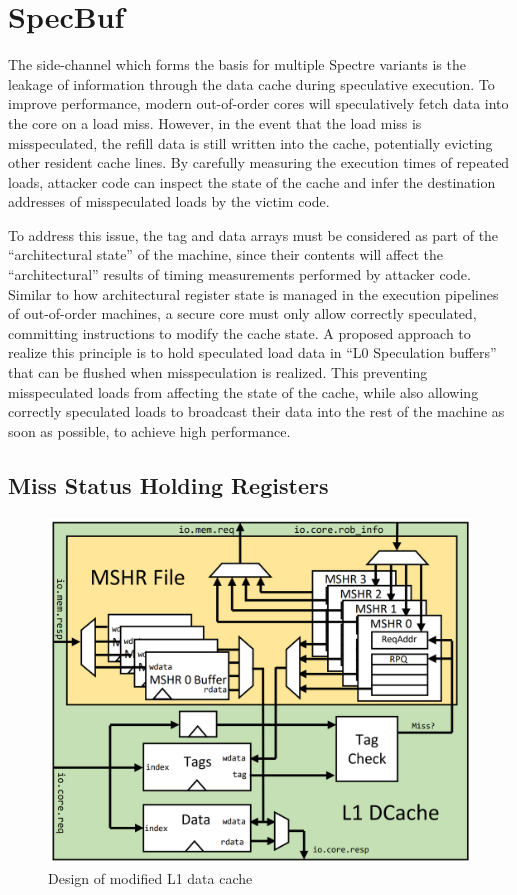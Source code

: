 \section{SpecBuf}
The side-channel which forms the basis for multiple Spectre variants is the leakage of information through the data cache during speculative execution.
To improve performance, modern out-of-order cores will speculatively fetch data into the core on a load miss. 
However, in the event that the load miss is misspeculated, the refill data is still written into the cache, potentially evicting other resident cache lines.
By carefully measuring the execution times of repeated loads, attacker code can inspect the state of the cache and infer the destination addresses of misspeculated loads by the victim code.

To address this issue, the tag and data arrays must be considered as part of the ``architectural state'' of the machine, since their contents will affect the ``architectural'' results of timing measurements performed by attacker code.
Similar to how architectural register state is managed in the execution pipelines of out-of-order machines, a secure core must only allow correctly speculated, committing instructions to modify the cache state.
A proposed approach to realize this principle is to hold speculated load data in ``L0 Speculation buffers'' that can be flushed when misspeculation is realized.
This preventing misspeculated loads from affecting the state of the cache, while also allowing correctly speculated loads to broadcast their data into the rest of the machine as soon as possible, to achieve high performance.

\subsection{Miss Status Holding Registers}
\begin{figure}
  \begin{center}\includegraphics[scale=0.17]{dcache.png}\end{center}
  \caption{Design of modified L1 data cache}
\end{figure}

